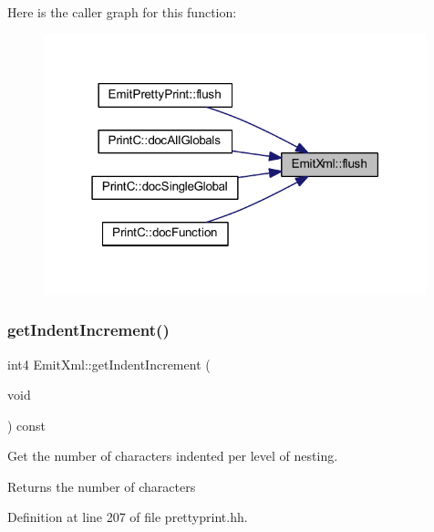 Here is the caller graph for this function\+:
\nopagebreak
\begin{figure}[H]
\begin{center}
\leavevmode
\includegraphics[width=315pt]{class_emit_xml_a4266748416715606d0028e2aec90dce8_icgraph}
\end{center}
\end{figure}
\mbox{\label{class_emit_xml_adf09a6bd87079c060b49a848514c79ae}} 
\subsubsection{\texorpdfstring{getIndentIncrement()}{getIndentIncrement()}}
{\footnotesize\ttfamily int4 Emit\+Xml\+::get\+Indent\+Increment (\begin{DoxyParamCaption}\item[{void}]{ }\end{DoxyParamCaption}) const\hspace{0.3cm}{\ttfamily [inline]}}



Get the number of characters indented per level of nesting. 

\begin{DoxyReturn}{Returns}
the number of characters 
\end{DoxyReturn}


Definition at line 207 of file prettyprint.\+hh.

\mbox{\label{class_emit_xml_a3867bff6084118990799e3d9a2c1eb00}} 
